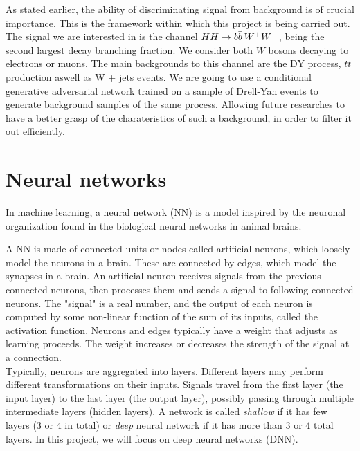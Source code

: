 \documentclass [12pt] {article}
\numberwithin{equation}{section} %
\numberwithin{figure}{section}   %
\newcommand{\HHquad}{\hspace{0.2em}}
\begin{document}
As stated earlier, the ability of discriminating signal from background is of crucial importance. This is the framework within which this project is being carried out.\\
The signal we are interested in is the channel $HH \rightarrow  b \Bar{b} \HHquad W^{+} W^-$, being the second largest decay branching fraction. We consider both $W$ bosons decaying to electrons or muons. The main backgrounds to this channel are the DY process, $t \Bar{t}$ production aswell as W + jets events.
We are going to use a conditional generative adversarial network trained on a sample of Drell-Yan events to generate background samples of the same process. Allowing future researches to have a better grasp of the charateristics of such a background, in order to filter it out efficiently.

\newpage



\newpage

\section{Neural networks}

In machine learning, a neural network (NN) is a model inspired by the neuronal organization found in the biological neural networks in animal brains.

A NN is made of connected units or nodes called artificial neurons, which loosely model the neurons in a brain. These are connected by edges, which model the synapses in a brain. An artificial neuron receives signals from the previous connected neurons, then processes them and sends a signal to following connected neurons. The "signal" is a real number, and the output of each neuron is computed by some non-linear function of the sum of its inputs, called the activation function. Neurons and edges typically have a weight that adjusts as learning proceeds. The weight increases or decreases the strength of the signal at a connection.\\

Typically, neurons are aggregated into layers. Different layers may perform different transformations on their inputs. Signals travel from the first layer (the input layer) to the last layer (the output layer), possibly passing through multiple intermediate layers (hidden layers). A network is called \textit{shallow} if it has few layers (3 or 4 in total) or \textit{deep} neural network if it has more than 3 or 4 total layers. In this project, we will focus on deep neural networks (DNN).\\
\end{document}

